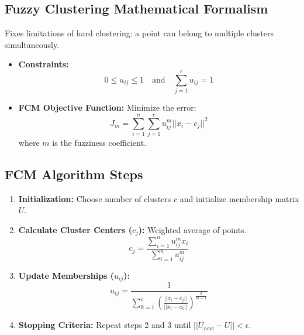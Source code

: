 \documentclass[11pt,a4paper]{article}
\begin{document}
\subsection{Fuzzy Clustering Mathematical Formalism}
Fixes limitations of hard clustering: a point can belong to multiple clusters simultaneously.
\begin{itemize}
    \item \textbf{Constraints:}
    \[ 0 \leq u_{ij} \leq 1 \quad \text{and} \quad \sum_{j=1}^{c} u_{ij} = 1 \]
    \item \textbf{FCM Objective Function:} Minimize the error:
    \[ J_m = \sum_{i=1}^{n}\sum_{j=1}^{c} u_{ij}^m ||x_i - c_j||^2 \]
    where $m$ is the fuzziness coefficient.
\end{itemize}

\subsection{FCM Algorithm Steps}
\begin{enumerate}
    \item \textbf{Initialization:} Choose number of clusters $c$ and initialize membership matrix $U$.
    \item \textbf{Calculate Cluster Centers ($c_j$):} Weighted average of points.
    \[ c_j = \frac{\sum_{i=1}^{n} u_{ij}^m x_i}{\sum_{i=1}^{n} u_{ij}^m} \]
    \item \textbf{Update Memberships ($u_{ij}$):}
    \[ u_{ij} = \frac{1}{\sum_{k=1}^{c} \left( \frac{||x_i - c_j||}{||x_i - c_k||} \right)^{\frac{2}{m-1}}} \]
    \item \textbf{Stopping Criteria:} Repeat steps 2 and 3 until $||U_{new} - U|| < \epsilon$.
\end{enumerate}
\end{document}
